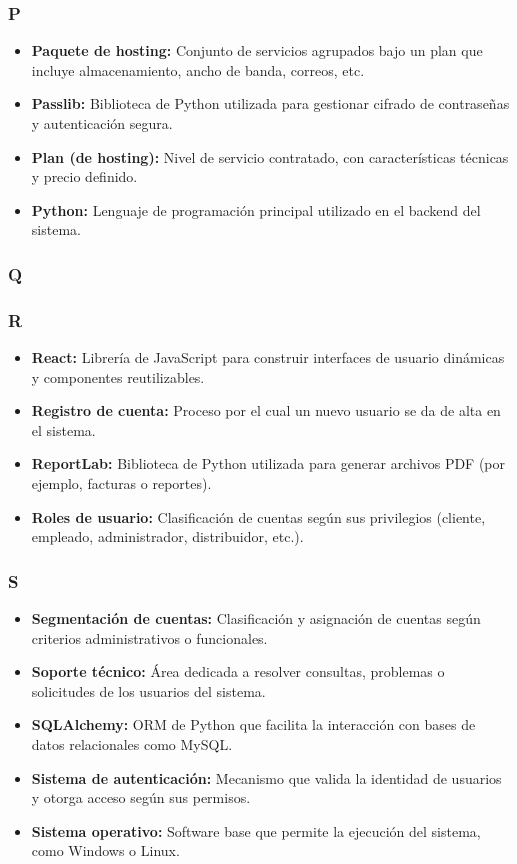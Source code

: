 \subsubsection*{P}
\begin{itemize}
    \item \textbf{Paquete de hosting:} Conjunto de servicios agrupados bajo un plan que incluye almacenamiento, ancho de banda, correos, etc.
    \item \textbf{Passlib:} Biblioteca de Python utilizada para gestionar cifrado de contraseñas y autenticación segura.
    \item \textbf{Plan (de hosting):} Nivel de servicio contratado, con características técnicas y precio definido.
    \item \textbf{Python:} Lenguaje de programación principal utilizado en el backend del sistema.
\end{itemize}

\subsubsection*{Q}

\subsubsection*{R}
\begin{itemize}
    \item \textbf{React:} Librería de JavaScript para construir interfaces de usuario dinámicas y componentes reutilizables.
    \item \textbf{Registro de cuenta:} Proceso por el cual un nuevo usuario se da de alta en el sistema.
    \item \textbf{ReportLab:} Biblioteca de Python utilizada para generar archivos PDF (por ejemplo, facturas o reportes).
    \item \textbf{Roles de usuario:} Clasificación de cuentas según sus privilegios (cliente, empleado, administrador, distribuidor, etc.).
\end{itemize}

\subsubsection*{S}
\begin{itemize}
    \item \textbf{Segmentación de cuentas:} Clasificación y asignación de cuentas según criterios administrativos o funcionales.
    \item \textbf{Soporte técnico:} Área dedicada a resolver consultas, problemas o solicitudes de los usuarios del sistema.
    \item \textbf{SQLAlchemy:} ORM de Python que facilita la interacción con bases de datos relacionales como MySQL.
    \item \textbf{Sistema de autenticación:} Mecanismo que valida la identidad de usuarios y otorga acceso según sus permisos.
    \item \textbf{Sistema operativo:} Software base que permite la ejecución del sistema, como Windows o Linux.
\end{itemize}

